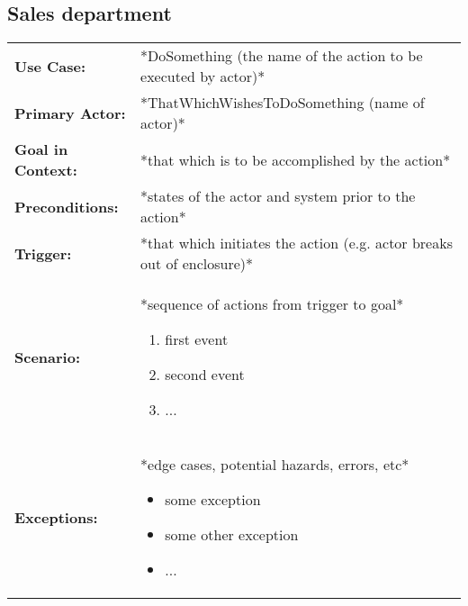 \documentclass[12pt]{article}
\begin{document}
    
    
    \subsection{Sales department}
    \begin{table}[H]
    \begin{tabular}{lp{9.9cm}}
        \hline
        \textbf{Use Case:}                     & *DoSomething (the name of the action to be executed by actor)* \\

        \textbf{Primary Actor:}                & *ThatWhichWishesToDoSomething (name of actor)*\\

        \textbf{Goal in Context:}              & *that which is to be accomplished by the action* \\

        \textbf{Preconditions:}                & *states of the actor and system prior to the action* \\

        \textbf{Trigger:}                      & *that which initiates the action (e.g. actor breaks out of enclosure)*\\

        \textbf{Scenario:}                     & *sequence of actions from trigger to goal*
                                                 \begin{enumerate}
                                                     \item first event
                                                     \item second event
                                                     \item ...
                                                 \end{enumerate} \\

        \textbf{Exceptions:}                   & *edge cases, potential hazards, errors, etc*
                                                 \begin{itemize}
                                                     \item[] some exception
                                                     \item[] some other exception
                                                     \item[] ...
                                                 \end{itemize}\\


\end{tabular}
\end{table}
\end{document}

